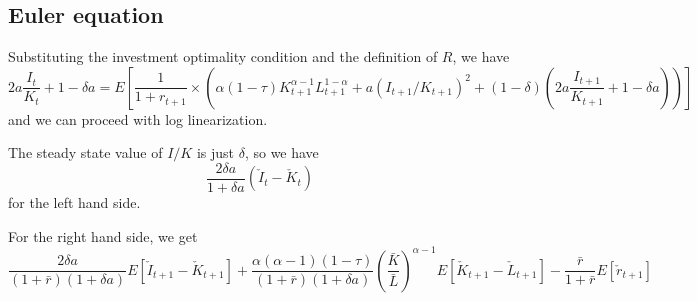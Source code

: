 \documentclass[11pt]{amsart}
\begin{document}
\subsection{Euler equation}

Substituting the investment optimality condition and the definition of $R$, we have
\begin{dmath*}
	2a \frac{I_t}{K_t} + 1 - \delta a = E\left[ \frac{1}{1+r_{t+1}} \times (\alpha (1-\tau) K_{t+1}^{\alpha-1} L_{t+1}^{1-\alpha} + a(I_{t+1} / K_{t+1})^2 + (1-\delta) (2a \frac{I_{t+1}}{K_{t+1}} + 1 - \delta a) )\right]
\end{dmath*}
and we can proceed with log linearization.

The steady state value of $I/K$ is just $\delta$, so we have
\[
\frac{2 \delta a}{1 + \delta a} (\check{I}_t - \check{K}_t)
\]
for the left hand side.

For the right hand side, we get
\[
\frac{2 \delta a}{(1+\bar{r})(1+ \delta a)} E[ \check{I}_{t+1} - \check{K}_{t+1} ] + \frac{\alpha (\alpha - 1) (1-\tau)}{(1+\bar{r})(1+ \delta a)} \left( \frac{\bar{K}}{\bar{L}} \right)^{\alpha -1} E[ \check{K}_{t+1} - \check{L}_{t+1} ]
- \frac{\bar{r}}{1+\bar{r}} E[\check{r}_{t+1}]
\]
\end{document}
